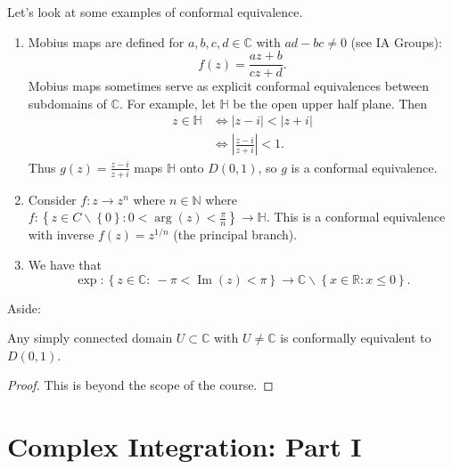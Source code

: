 \documentclass[a4paper]{scrartcl}
\begin{document}
\begin{example*}
     Let's look at some examples of conformal equivalence.
      \begin{enumerate}
           \item Mobius maps are defined for $a,b,c,d \in \mathbb{C}$ with $ad-bc \neq 0$ (see IA Groups): \[
           f (z)= \frac{az+b}{cz+d}
           .\] Mobius maps sometimes serve as explicit conformal equivalences between subdomains of $\mathbb{C}$. For example, let $\mathbb{H}$ be the open upper half plane. Then 
           \begin{align*}
                z \in \mathbb{H} &\iff |z-i| < |z+i|\\
                & \iff | \frac{z-i}{z+i}|<1.
           \end{align*}
           Thus $g (z)=\frac{z-i}{z+i}$ maps $\mathbb{H}$ onto $D (0,1)$, so $g$ is a conformal equivalence.
           \item Consider $f: z \rightarrow z^{n}$ where $n \in \mathbb{N}$ where $f: \left\{z \in C \backslash \left\{0\right\}: 0 < \operatorname{arg}(z) < \frac{\pi}{n}\right\} \rightarrow \mathbb{H}$. This is a conformal equivalence with inverse $f (z)=z^{1/n}$ (the principal branch).
           \item We have that \[
           \operatorname{exp}: \left\{z \in \mathbb{C}: \ -\pi < \operatorname{Im}(z)<\pi\right\} \rightarrow \mathbb{C} \backslash \left\{x \in \mathbb{R}: x \leq 0\right\}
           .\]  
      \end{enumerate}
\end{example*}
Aside:
\begin{theorem}
      Any simply connected domain $U \subset \mathbb{C}$ with $U \neq \mathbb{C}$ is conformally equivalent to $D (0,1)$.
\end{theorem}
\begin{proof}
      This is beyond the scope of the course.\footnotemark
\end{proof}
\section{Complex Integration: Part I}
\end{document}

